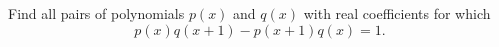 Find all pairs of polynomials $p(x)$ and $q(x)$ with real coefficients for which
\[
p(x) q(x+1) - p(x+1) q(x) = 1.
\]
